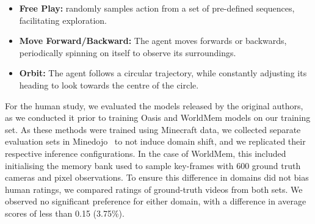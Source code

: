 \documentclass{article}
\theoremstyle{plain}
\theoremstyle{definition}
\theoremstyle{remark}
\begin{document}
\begin{itemize}
    \item \textbf{Free Play:} randomly samples action from a set of pre-defined sequences, facilitating exploration.
    \item \textbf{Move Forward/Backward:} The agent moves forwards or backwards, periodically spinning on itself to observe its surroundings.
    \item \textbf{Orbit:} The agent follows a circular trajectory, while constantly adjusting its heading to look towards the centre of the circle.
\end{itemize}


For the human study, we evaluated the models released by the original authors, as we conducted it prior to training Oasis and WorldMem models on our training set. As these methods were trained using Minecraft data, we collected separate evaluation sets in Minedojo~\citep{fan2022minedojo} to not induce domain shift, and we replicated their respective inference configurations. In the case of WorldMem, this included initialising the memory bank used to sample key-frames with 600 ground truth cameras and pixel observations. To ensure this difference in domains did not bias human ratings, we compared ratings of ground-truth videos from both sets. We observed no significant preference for either domain, with a difference in average scores of less than 0.15 (3.75\%).
\end{document}
